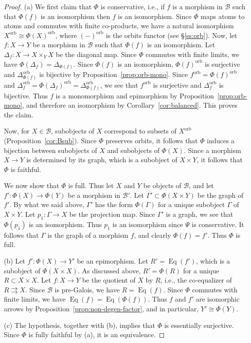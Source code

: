 \documentclass[12pt]{amsart}
\numberwithin{equation}{section}
\theoremstyle{definition}
\newcommand{\cB}{\mathcal{B}}
\DeclareMathOperator{\Eq}{Eq}
\newcommand{\orb}{\mathrm{orb}}
\begin{document}
\begin{proof}
(a) We first claim that $\Phi$ is conservative, i.e., if $f$ is a morphism in $\cB$ such that $\Phi(f)$ is an isomorphism then $f$ is an isomorphism. Since $\Phi$ maps atoms to atoms and commutes with finite co-products, we have a natural isomorphism $X^{\orb} \cong \Phi(X)^{\orb}$, where $(-)^{\orb}$ is the orbits functor (see \S \ref{ss:orb}). Now, let $f \colon X \to Y$ be a morphism in $\cB$ such that $\Phi(f)$ is an isomorphism. Let $\Delta_f \colon X \to X \times_Y X$ be the diagonal map. Since $\Phi$ commutes with finite limits, we have $\Phi(\Delta_f)=\Delta_{\Phi(f)}$. Since $\Phi(f)$ is an isomorphism, $\Phi(f)^{\orb}$ is surjective and $\Delta_{\Phi(f)}^{\orb}$ is bijective by Proposition~\ref{prop:orb-mono}. Since $f^{\orb} = \Phi(f)^{\orb}$ and $\Delta_f^{\orb} = \Phi(\Delta_f)^{\orb}=\Delta_{\Phi(f)}^{\orb}$, we see that $f^{\orb}$ is surjective and $\Delta_f^{\orb}$ is bijective. Thus $f$ is a monomorphism and epimorphism by Proposition~\ref{prop:orb-mono}, and therefore an isomorphism by Corollary~\ref{cor:balanced}. This proves the claim.

Now, for $X \in \cB$, subobjects of $X$ correspond to subsets of $X^{\orb}$ (Proposition~\ref{cor:Bsub}). Since $\Phi$ preserves orbits, it follows that $\Phi$ induces a bijection between subobjects of $X$ and subobjects of $\Phi(X)$. Since a morphism $X \to Y$ is determined by its graph, which is a subobject of $X \times Y$, it follows that $\Phi$ is faithful.

We now show that $\Phi$ is full. Thus let $X$ and $Y$ be objects of $\cB$, and let $f' \colon \Phi(X) \to \Phi(Y)$ be a morphism in $\cB'$. Let $\Gamma' \subset \Phi(X \times Y)$ be the graph of $f'$. By what we said above, $\Gamma'$ has the form $\Phi(\Gamma)$ for a unique subobject $\Gamma$ of $X \times Y$. Let $p_1 \colon \Gamma \to X$ be the projection map. Since $\Gamma'$ is a graph, we see that $\Phi(p_1)$ is an isomorphism. Thus $p_1$ is an isomorphism since $\Psi$ is conservative. It follows that $\Gamma$ is the graph of a morphism $f$, and clearly $\Phi(f)=f'$. Thus $\Phi$ is full.

(b) Let $f' \colon \Phi(X) \to Y'$ be an epimorphism. Let $R' = \Eq(f')$, which is a subobject of $\Phi(X \times X)$. As discussed above, $R'=\Phi(R)$ for a unique $R \subset X \times X$. Let $f \colon X \to Y$ be the quotient of $X$ by $R$, i.e., the co-equalizer of $R \rightrightarrows X$. Since $\cB$ is pre-Galois, we have $R=\Eq(f)$. Since $\Phi$ commutes with finite limits, we have $\Eq(f)=\Eq(\Phi(f))$. Thus $f$ and $f'$ are isomorphic arrows by Proposition~\ref{prop:non-degen-factor}, and in particular, $Y' \cong \Phi(Y)$.

(c) The hypothesis, together with (b), implies that $\Phi$ is essentially surjective. Since $\Phi$ is fully faithful by (a), it is an equivalence.
\end{proof}
\end{document}
